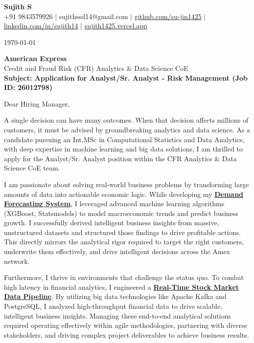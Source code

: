 \documentclass[a4paper,11pt]{article}
\newcommand{\ulink}[2]{\href{#1}{#2}}
\begin{document}
\pagestyle{empty}

\begin{center}
{\color[HTML]{000000}\fontsize{30}{35}\selectfont\bfseries Sujith S} \\[5pt]
{\fontsize{10.5}{12.5}\selectfont\textcolor[HTML]{3A3A3A}{+91 9843579926 $|$ sujithssd14@gmail.com $|$ \ulink{https://github.com/su-jin1425}{github.com/su-jin1425} $|$ \ulink{https://linkedin.com/in/sujith14}{linkedin.com/in/sujith14} $|$ \ulink{https://sujith1425.vercel.app}{sujith1425.vercel.app}}}
\end{center}

\vspace{10pt}

\today

\textbf{American Express} \\
Credit and Fraud Risk (CFR) Analytics \& Data Science CoE \\

\textbf{Subject: Application for Analyst/Sr. Analyst - Risk Management (Job ID: 26012798)}

Dear Hiring Manager,

A single decision can have many outcomes. When that decision affects millions of customers, it must be advised by groundbreaking analytics and data science. As a candidate pursuing an Int.MSc in Computational Statistics and Data Analytics, with deep expertise in machine learning and big data solutions, I am thrilled to apply for the Analyst/Sr. Analyst position within the CFR Analytics \& Data Science CoE team.

I am passionate about solving real-world business problems by transforming large amounts of data into actionable economic logic. While developing my \ulink{https://github.com/su-jin1425/Demand-Forecasting-System}{\textbf{Demand Forecasting System}}, I leveraged advanced machine learning algorithms (XGBoost, Statsmodels) to model macroeconomic trends and predict business growth. I successfully derived intelligent business insights from massive, unstructured datasets and structured those findings to drive profitable actions. This directly mirrors the analytical rigor required to target the right customers, underwrite them effectively, and drive intelligent decisions across the Amex network.

Furthermore, I thrive in environments that challenge the status quo. To combat high latency in financial analytics, I engineered a \ulink{https://github.com/su-jin1425/Real-Time-Stock-Market-Data-Pipeline}{\textbf{Real-Time Stock Market Data Pipeline}}. By utilizing big data technologies like Apache Kafka and PostgreSQL, I analyzed high-throughput financial data to drive scalable, intelligent business insights. Managing these end-to-end analytical solutions required operating effectively within agile methodologies, partnering with diverse stakeholders, and driving complex project deliverables to achieve business results.
\end{document}
